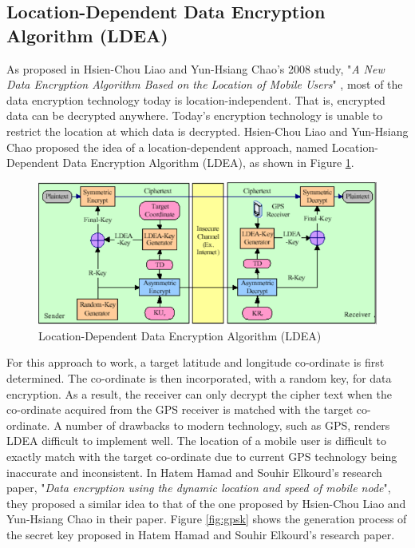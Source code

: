 \documentclass[journal]{IEEEtran}
\begin{document}
\subsection{\textbf{Location-Dependent Data Encryption Algorithm (LDEA)}}
As proposed in Hsien-Chou Liao and Yun-Hsiang Chao's 2008 study, "\textit{A New Data Encryption Algorithm Based on the Location of Mobile Users}" \cite{new_encryption_mobile}, most of the data encryption technology today is location-independent. That is, encrypted data can be decrypted anywhere. Today's encryption technology is unable to restrict the location at which data is decrypted. Hsien-Chou Liao and Yun-Hsiang Chao proposed the idea of a location-dependent approach, named Location-Dependent Data Encryption Algorithm (LDEA), as shown in Figure \ref{fig:ldea}. 

\newline
\begin{figure}[!h]
    \centering
    \includegraphics[scale=.6]{ldea}
    \caption{Location-Dependent Data Encryption Algorithm (LDEA)}
    \label{fig:ldea}
\end{figure}

For this approach to work, a target latitude and longitude co-ordinate is first determined. The co-ordinate is then incorporated, with a random key, for data encryption. As a result, the receiver can only decrypt the cipher text when the co-ordinate acquired from the GPS receiver is matched with the target co-ordinate. A number of drawbacks to modern technology, such as GPS, renders LDEA difficult to implement well. The location of a mobile user is difficult to exactly match with the target co-ordinate due to current GPS technology being inaccurate and inconsistent.
\newline\newline
In Hatem Hamad and Souhir Elkourd's research paper, "\textit{Data encryption using the dynamic location and speed of mobile node}", they proposed a similar idea to that of the one proposed by Hsien-Chou Liao and Yun-Hsiang Chao in their paper. Figure \ref{fig:gpsk} shows the generation process of the secret key proposed in Hatem Hamad and Souhir Elkourd's research paper. 
\end{document}
